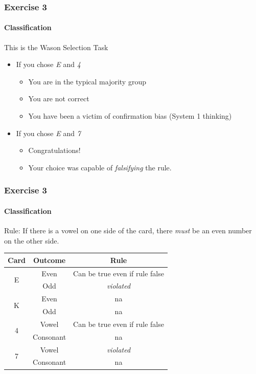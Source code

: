 \begin{frame}
  \frametitle{Exercise 3}
  \framesubtitle{Classification}
  This is the Wason Selection Task
  \begin{itemize}
    \item<1-> If you chose \emph{E} and \emph{4}
    \begin{itemize}
      \item<2-> You are in the typical majority group
      \item<2-> You are not correct
      \item<2-> You have been a victim of confirmation bias (System 1 thinking)
    \end{itemize}
    \item<3-> If you chose \emph{E} and \emph{7}
    \begin{itemize}
      \item<4-> Congratulations!
      \item<4-> Your choice was capable of \textit{falsifying} the rule.
    \end{itemize}
  \end{itemize}
\end{frame}

\begin{frame}
  \frametitle{Exercise 3}
  \framesubtitle{Classification}
  Rule: If there is a vowel on one side of the card, there \textit{must} be an even number on the other side.    
  \begin{center}
  \begin{tabular}{c|c|c}
	  Card & Outcome & Rule \\
	  \hline
	  \hline
	    \multirow{2}{*}{E} & Even & Can be true even if rule false \\
	                                & Odd & \emph{violated} \\
	  \hline
	    \multirow{2}{*}{K} & Even & na \\
	                                & Odd & na \\	    
	  \hline
	    \multirow{2}{*}{4} & Vowel & Can be true even if rule false \\
	                                & Consonant & na \\
	  \hline
	    \multirow{2}{*}{7} & Vowel & \emph{violated} \\
	                                & Consonant & na \\	    
  \end{tabular}
  \end{center}
\end{frame}

